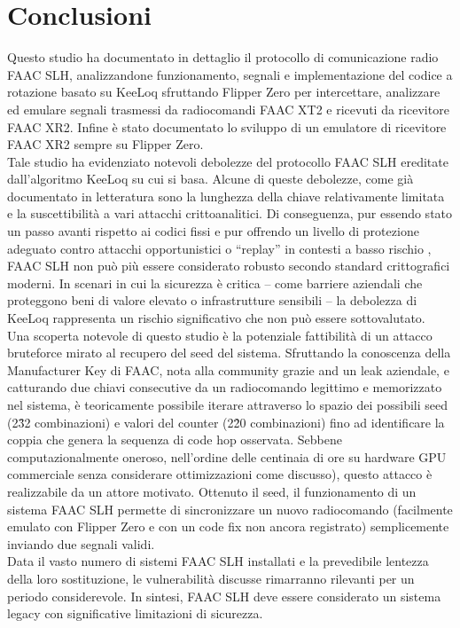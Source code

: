 \chapter{Conclusioni}
\label{cha:conclusions}

Questo studio ha documentato in dettaglio il protocollo di comunicazione radio FAAC SLH, analizzandone funzionamento, segnali e implementazione del codice a rotazione basato su KeeLoq sfruttando Flipper Zero per intercettare, analizzare ed emulare segnali trasmessi da radiocomandi FAAC XT2 e ricevuti da ricevitore FAAC XR2. Infine è stato documentato lo sviluppo di un emulatore di ricevitore FAAC XR2 sempre su Flipper Zero.\\
Tale studio ha evidenziato notevoli debolezze del protocollo FAAC SLH ereditate dall’algoritmo KeeLoq su cui si basa. Alcune di queste debolezze, come già documentato in letteratura sono la lunghezza della chiave relativamente limitata e la suscettibilità a vari attacchi crittoanalitici. Di conseguenza, pur essendo stato un passo avanti rispetto ai codici fissi e pur offrendo un livello di protezione adeguato contro attacchi opportunistici o “replay” in contesti a basso rischio , FAAC SLH non può più essere considerato robusto secondo standard crittografici moderni. In scenari in cui la sicurezza è critica – come barriere aziendali che proteggono beni di valore elevato o infrastrutture sensibili – la debolezza di KeeLoq rappresenta un rischio significativo che non può essere sottovalutato.\\
Una scoperta notevole di questo studio è la potenziale fattibilità di un attacco bruteforce mirato al recupero del seed del sistema. Sfruttando la conoscenza della Manufacturer Key di FAAC, nota alla community grazie and un leak aziendale, e catturando due chiavi consecutive da un radiocomando legittimo e memorizzato nel sistema, è teoricamente possibile iterare attraverso lo spazio dei possibili seed (2\^32 combinazioni) e valori del counter (2\^20 combinazioni) fino ad identificare la coppia che genera la sequenza di code hop osservata. Sebbene computazionalmente oneroso, nell’ordine delle centinaia di ore su hardware GPU commerciale senza considerare ottimizzazioni come discusso), questo attacco è realizzabile da un attore motivato. Ottenuto il seed, il funzionamento di un sistema FAAC SLH permette di sincronizzare un nuovo radiocomando (facilmente emulato con Flipper Zero e con un code fix non ancora registrato) semplicemente inviando due segnali validi.\\
Data il vasto numero di sistemi FAAC SLH installati e la prevedibile lentezza della loro sostituzione, le vulnerabilità discusse rimarranno rilevanti per un periodo considerevole. In sintesi, FAAC SLH deve essere considerato un sistema legacy con significative limitazioni di sicurezza.

